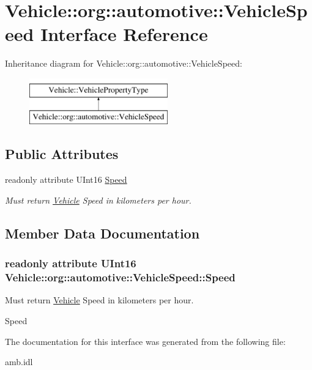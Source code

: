 \hypertarget{interfaceVehicle_1_1org_1_1automotive_1_1VehicleSpeed}{\section{Vehicle\-:\-:org\-:\-:automotive\-:\-:Vehicle\-Speed Interface Reference}
\label{interfaceVehicle_1_1org_1_1automotive_1_1VehicleSpeed}
}
Inheritance diagram for Vehicle\-:\-:org\-:\-:automotive\-:\-:Vehicle\-Speed\-:\begin{figure}[H]
\begin{center}
\leavevmode
\includegraphics[height=2.000000cm]{interfaceVehicle_1_1org_1_1automotive_1_1VehicleSpeed}
\end{center}
\end{figure}
\subsection*{Public Attributes}
\begin{DoxyCompactItemize}
\item 
readonly attribute U\-Int16 \hyperlink{interfaceVehicle_1_1org_1_1automotive_1_1VehicleSpeed_a2f073650894aee26ceaf8ca16299c0b7}{Speed}
\begin{DoxyCompactList}\small\item\em Must return \hyperlink{namespaceVehicle}{Vehicle} Speed in kilometers per hour. \end{DoxyCompactList}\end{DoxyCompactItemize}


\subsection{Member Data Documentation}
\hypertarget{interfaceVehicle_1_1org_1_1automotive_1_1VehicleSpeed_a2f073650894aee26ceaf8ca16299c0b7}{
\subsubsection[{Speed}]{\setlength{\rightskip}{0pt plus 5cm}readonly attribute U\-Int16 Vehicle\-::org\-::automotive\-::\-Vehicle\-Speed\-::\-Speed}}\label{interfaceVehicle_1_1org_1_1automotive_1_1VehicleSpeed_a2f073650894aee26ceaf8ca16299c0b7}


Must return \hyperlink{namespaceVehicle}{Vehicle} Speed in kilometers per hour. 

Speed 

The documentation for this interface was generated from the following file\-:\begin{DoxyCompactItemize}
\item 
amb.\-idl\end{DoxyCompactItemize}
